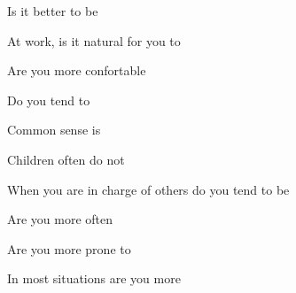 \documentclass[english,pdf,pagemark,stamp,globalid=\candidateID,oneside,PrintQuestionnaireId=False]{sdaps}
\begin{document}
\begin{questionnaire}
\begin{multicols}{2}
\begin{choicequestion}[2]{Is it better to be}
\end{choicequestion}

\begin{choicequestion}[2]{At work, is it natural for you to}
\end{choicequestion}

\begin{choicequestion}[2]{Are you more confortable}
\end{choicequestion}

\begin{choicequestion}[2]{Do you tend to}
\end{choicequestion}

\begin{choicequestion}[2]{Common sense is}
\end{choicequestion}

\begin{choicequestion}[2]{Children often do not}
\end{choicequestion}

\begin{choicequestion}[2]{When you are in charge of others do you tend to be}
\end{choicequestion}

\begin{choicequestion}[2]{Are you more often}
\end{choicequestion}

\begin{choicequestion}[2]{Are you more prone to}
\end{choicequestion}

\begin{choicequestion}[2]{In most situations are you more}
\end{choicequestion}


\end{multicols}
\end{questionnaire}
\end{document}

